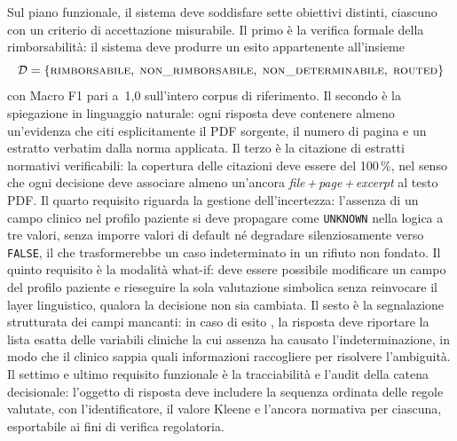 Sul piano funzionale, il sistema deve soddisfare sette obiettivi distinti,
ciascuno con un criterio di accettazione misurabile.
Il primo è la verifica formale della rimborsabilità: il sistema deve produrre
un esito appartenente all'insieme
\[
  \mathcal{D} = \{\textsc{rimborsabile},\;
  \textsc{non\_rimborsabile},\;
  \textsc{non\_determinabile},\;
  \textsc{routed}\}
\]
con Macro F1 pari a~1,0 sull'intero corpus di riferimento.
Il secondo è la spiegazione in linguaggio naturale: ogni risposta deve contenere
almeno un'evidenza che citi esplicitamente il PDF sorgente, il numero di pagina
e un estratto verbatim dalla norma applicata.
Il terzo è la citazione di estratti normativi verificabili: la copertura
delle citazioni deve essere del 100\,\%, nel senso che ogni decisione deve
associare almeno un'ancora \emph{file\,+\,page\,+\,excerpt} al testo PDF.
Il quarto requisito riguarda la gestione dell'incertezza: l'assenza di un
campo clinico nel profilo paziente si deve propagare come
\texttt{UNKNOWN} nella logica a tre valori, senza imporre valori di default
né degradare silenziosamente verso \texttt{FALSE}, il che trasformerebbe
un caso indeterminato in un rifiuto non fondato.
Il quinto requisito è la modalità what-if: deve essere possibile modificare
un campo del profilo paziente e rieseguire la sola valutazione simbolica
senza reinvocare il layer linguistico, qualora la decisione non sia cambiata.
Il sesto è la segnalazione strutturata dei campi mancanti: in caso di esito
, la risposta deve riportare la lista esatta
delle variabili cliniche la cui assenza ha causato l'indeterminazione,
in modo che il clinico sappia quali informazioni raccogliere per risolvere
l'ambiguità.
Il settimo e ultimo requisito funzionale è la tracciabilità e l'audit
della catena decisionale: l'oggetto di risposta deve includere la sequenza
ordinata delle regole valutate, con l'identificatore, il valore Kleene
e l'ancora normativa per ciascuna, esportabile ai fini di verifica regolatoria.

